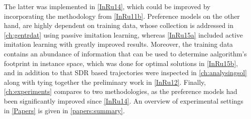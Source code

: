 The latter was implemented in \cref{InRu14}, which could be improved by 
incorporating the methodology from \cref{InRu11b}.
Preference models on  the other hand, are highly dependent on training data, 
whose collection is addressed in \cref{ch:gentrdat} using passive imitation 
learning, whereas \cref{InRu15a} included active imitation learning with 
greatly improved results. 
Moreover, the training data contains an abundance of information that can be 
used to determine aalgorithm's footprint in instance space, which was done for 
optimal solutions in \cref{InRu15b}, and in addition to that SDR based 
trajectories were inspected in \cref{ch:analysingsol} along with tying together 
the preliminary work in \cref{InRu12}. 
Finally, \cref{ch:experiments} compares to two methodologies, as the preference 
models had been significantly improved since \cref{InRu14}.
An overview of experimental settings in \cref{Papers} is given in 
\cref{papers:summary}.
    

